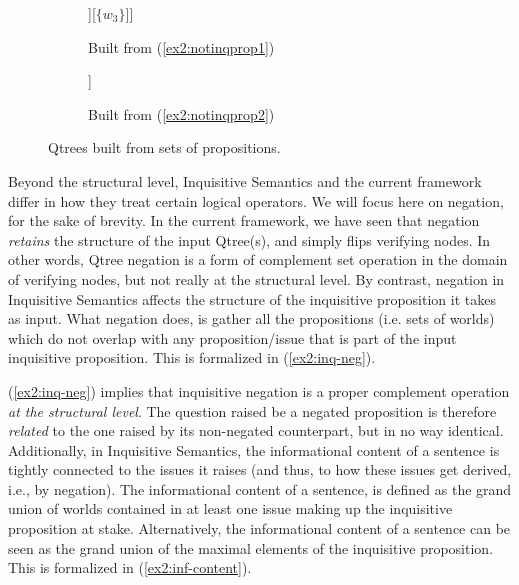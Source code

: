 \begin{figure}[H]
	\centering
	\begin{subfigure}[b]{.45\linewidth}
		\centering
		\begin{forest}
			[{$\lbrace w_1, w_2, w_3 \rbrace$}[{$\lbrace w_1, w_2 \rbrace$}[{$\lbrace w_1 \rbrace$}][{$\lbrace w_2 \rbrace$}]][{$\lbrace w_3 \rbrace$}]]
		\end{forest}
		\caption{Built from (\ref{ex2:notinqprop1})}\label{fig2:notinqprop1}
	\end{subfigure}
	\hfil
	\begin{subfigure}[b]{.45\linewidth}
		\centering
		\begin{forest}
			[{$\lbrace w_1, w_2, w_3 \rbrace$}[{$\lbrace w_1, w_2 \rbrace$}][{$\lbrace w_3 \rbrace$}]]
		\end{forest}
		\caption{Built from (\ref{ex2:notinqprop2})}\label{fig2:notinqprop2}
	\end{subfigure}
	\caption{Qtrees built from sets of propositions.}
\end{figure}

Beyond the structural level, Inquisitive Semantics and the current framework differ in how they treat certain logical operators. We will focus here on negation, for the sake of brevity. In the current framework, we have seen that negation \textit{retains} the structure of the input Qtree(s), and simply flips verifying nodes. In other words, Qtree negation is a form of complement set operation in the domain of verifying nodes, but not really at the structural level. By contrast, negation in Inquisitive Semantics affects the structure of the inquisitive proposition it takes as input. What negation does, is gather all the propositions (i.e. sets of worlds) which do not overlap with any proposition/issue that is part of the input inquisitive proposition. This is formalized in (\ref{ex2:inq-neg}).

\begin{exe}
	\label{ex2:inq-neg}
\end{exe}

(\ref{ex2:inq-neg}) implies that inquisitive negation is a proper complement operation \textit{at the structural level}. The question raised be a negated proposition is therefore \textit{related} to the one raised by its non-negated counterpart, but in no way identical. Additionally, in Inquisitive Semantics, the informational content of a sentence is tightly connected to the issues it raises (and thus, to how these issues get derived, i.e., by negation). The informational content of a sentence, is defined as the grand union of worlds contained in at least one issue making up the inquisitive proposition at stake. Alternatively, the informational content of a sentence can be seen as the grand union of the maximal elements of the inquisitive proposition. This is formalized in (\ref{ex2:inf-content}).


